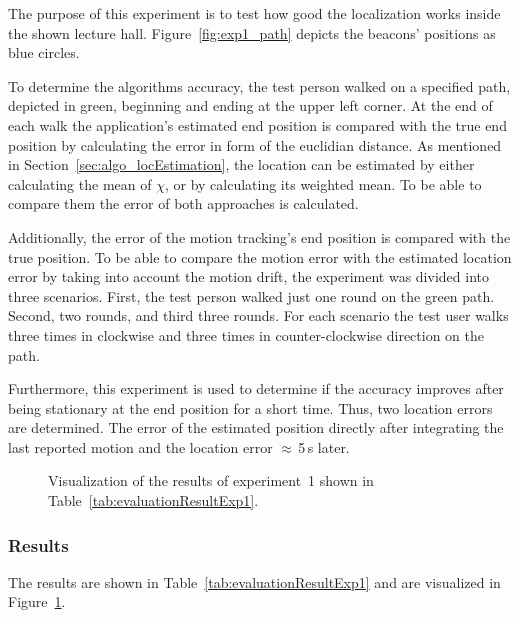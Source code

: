 The purpose of this experiment is to test how good the localization works inside the shown lecture hall. Figure~\ref{fig:exp1_path} depicts the beacons' positions as blue circles.

To determine the algorithms accuracy, the test person walked on a specified path, depicted in green, beginning and ending at the upper left corner. At the end of each walk the application's estimated end position is compared with the true end position by calculating the error in form of the euclidian distance. As mentioned in Section~\ref{sec:algo_locEstimation}, the location can be estimated by either calculating the mean of $\chi$, or by calculating its weighted mean. To be able to compare them the error of both approaches is calculated.

Additionally, the error of the motion tracking's end position is compared with the true position. To be able to compare the motion error with the estimated location error by taking into account the motion drift, the experiment was divided into three scenarios. First, the test person walked just one round on the green path. Second, two rounds, and third three rounds. For each scenario the test user walks three times in clockwise and three times in counter-clockwise direction on the path.

Furthermore, this experiment is used to determine if the accuracy improves after being stationary at the end position for a short time. Thus, two location errors are determined. The error of the estimated position directly after integrating the last reported motion and the location error $\approx$\,5\,s later.


\begin{table}
	
	\caption{Results of experiment~1. $\mu$ is the mean error and $\sigma$ the error's standard deviation by using the particle set's mean for the location estimation. $\mu_w$ and $\sigma_w$ are determined by using the particle set's weighted mean.}
	\label{tab:evaluationResultExp1}
\end{table}

\begin{figure}
	
	\caption{Visualization of the results of experiment~1 shown in Table~\ref{tab:evaluationResultExp1}.}
	\label{fig:exp1_visualization}
\end{figure}

\subsubsection*{Results}
The results are shown in Table~\ref{tab:evaluationResultExp1} and are visualized in Figure~\ref{fig:exp1_visualization}.

